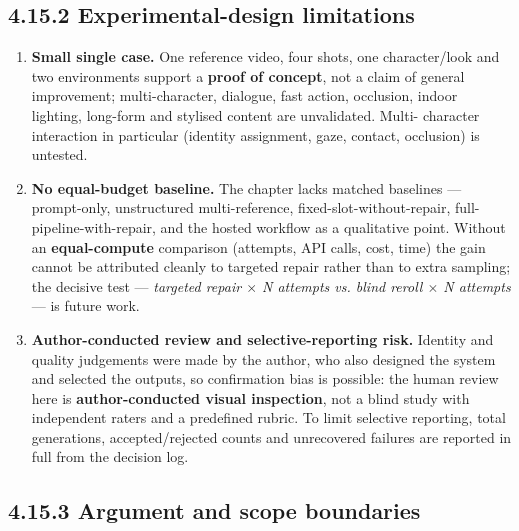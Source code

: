 \documentclass[10pt,twocolumn,letterpaper]{article}
\begin{document}

\subsection*{4.15.2 Experimental-design limitations}

\begin{enumerate}[leftmargin=1.4em,itemsep=2pt,topsep=2pt]

\item \textbf{Small single case.} One reference video, four shots, one character/look and two environments support a \textbf{proof of concept}, not a claim of general improvement; multi-character, dialogue, fast action, occlusion, indoor lighting, long-form and stylised content are unvalidated. Multi- character interaction in particular (identity assignment, gaze, contact, occlusion) is untested.

\item \textbf{No equal-budget baseline.} The chapter lacks matched baselines --- prompt-only, unstructured multi-reference, fixed-slot-without-repair, full-pipeline-with-repair, and the hosted workflow as a qualitative point. Without an \textbf{equal-compute} comparison (attempts, API calls, cost, time) the gain cannot be attributed cleanly to targeted repair rather than to extra sampling; the decisive test --- \emph{targeted repair $\times$ N attempts vs. blind reroll $\times$ N attempts} --- is future work.

\item \textbf{Author-conducted review and selective-reporting risk.} Identity and quality judgements were made by the author, who also designed the system and selected the outputs, so confirmation bias is possible: the human review here is \textbf{author-conducted visual inspection}, not a blind study with independent raters and a predefined rubric. To limit selective reporting, total generations, accepted/rejected counts and unrecovered failures are reported in full from the decision log.

\end{enumerate}


\subsection*{4.15.3 Argument and scope boundaries}
\end{document}
